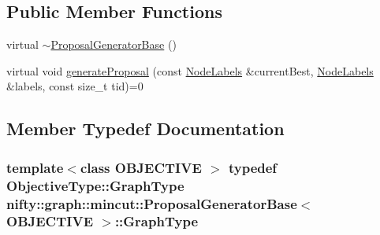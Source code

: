 \subsection*{Public Member Functions}
\begin{DoxyCompactItemize}
\item 
virtual \hyperlink{classnifty_1_1graph_1_1mincut_1_1ProposalGeneratorBase_aa1f968c3f16cc48c102d2da631a06228}{$\sim$\+Proposal\+Generator\+Base} ()
\item 
virtual void \hyperlink{classnifty_1_1graph_1_1mincut_1_1ProposalGeneratorBase_ace4b743ff4caff832f5db0ad131c292a}{generate\+Proposal} (const \hyperlink{classnifty_1_1graph_1_1mincut_1_1ProposalGeneratorBase_aa0c91c4d0f598763fdd2ae46ebd06437}{Node\+Labels} \&current\+Best, \hyperlink{classnifty_1_1graph_1_1mincut_1_1ProposalGeneratorBase_aa0c91c4d0f598763fdd2ae46ebd06437}{Node\+Labels} \&labels, const size\+\_\+t tid)=0
\end{DoxyCompactItemize}


\subsection{Member Typedef Documentation}
\hypertarget{classnifty_1_1graph_1_1mincut_1_1ProposalGeneratorBase_aa652360093005592c3899117e129847c}{}
\subsubsection[{Graph\+Type}]{\setlength{\rightskip}{0pt plus 5cm}template$<$class O\+B\+J\+E\+C\+T\+I\+V\+E $>$ typedef Objective\+Type\+::\+Graph\+Type {\bf nifty\+::graph\+::mincut\+::\+Proposal\+Generator\+Base}$<$ O\+B\+J\+E\+C\+T\+I\+V\+E $>$\+::{\bf Graph\+Type}}\label{classnifty_1_1graph_1_1mincut_1_1ProposalGeneratorBase_aa652360093005592c3899117e129847c}
\hypertarget{classnifty_1_1graph_1_1mincut_1_1ProposalGeneratorBase_a0d24cbda65bb608f0b74e1316f0317a2}{}
